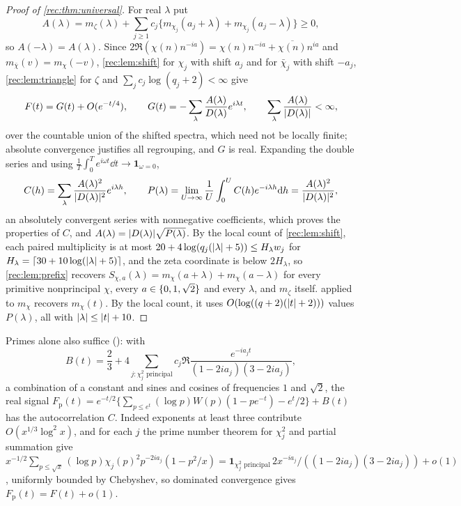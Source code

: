 \begin{proof}[Proof of \cref{rec:thm:universal}]
For real $\lambda$ put
\[
 A(\lambda)=m_\zeta(\lambda)+\sum_{j\ge1}c_j\bigl\{m_{\chi_j}(a_j+\lambda)+m_{\chi_j}(a_j-\lambda)\bigr\}\ge0,
\]
so $A(-\lambda)=A(\lambda)$. Since $2\Re(\chi(n)n^{-ia})=\chi(n)n^{-ia}+\overline{\chi(n)}n^{ia}$ and
$m_{\bar\chi}(v)=m_\chi(-v)$, \cref{rec:lem:shift} for $\chi_j$ with shift $a_j$ and for $\bar\chi_j$ with shift $-a_j$,
\cref{rec:lem:triangle} for $\zeta$ and $\sum_jc_j\log(q_j+2)<\infty$ give
\[
 F(t)=G(t)+O(e^{-t/4}),\qquad G(t)=-\sum_\lambda\frac{A(\lambda)}{D(\lambda)}e^{i\lambda t},\qquad\sum_\lambda\frac{A(\lambda)}{\lvert D(\lambda)\rvert}<\infty,
\]
over the countable union of the shifted spectra, which need not be locally finite; absolute convergence
justifies all regrouping, and $G$ is real. Expanding the double series and using
$\frac1T\int_0^Te^{i\omega t}\dd t\to\mathbf 1_{\omega=0}$,
\[
 C(h)=\sum_\lambda\frac{A(\lambda)^2}{\lvert D(\lambda)\rvert^2}e^{i\lambda h},\qquad
 P(\lambda)=\lim_{U\to\infty}\frac1U\int_0^UC(h)e^{-i\lambda h}\mathrm{d} h=\frac{A(\lambda)^2}{\lvert D(\lambda)\rvert^2},
\]
an absolutely convergent series with nonnegative coefficients, which proves the properties of $C$, and
$A(\lambda)=\lvert D(\lambda)\rvert\sqrt{P(\lambda)}$. By the local count of \cref{rec:lem:shift}, each paired multiplicity is at most
$20+4\log(q_j(\lvert\lambda\rvert+5))\le H_\lambda w_j$ for $H_\lambda=\lceil30+10\log(\lvert\lambda\rvert+5)\rceil$, and the zeta coordinate is
below $2H_\lambda$, so \cref{rec:lem:prefix} recovers $S_{\chi,a}(\lambda)=m_\chi(a+\lambda)+m_\chi(a-\lambda)$ for every primitive
nonprincipal $\chi$, every $a\in\{0,1,\sqrt2\}$ and every $\lambda$, and $m_\zeta$ itself.  applied to
$m_\chi$ recovers $m_\chi(t)$. By the local count, it uses $O(\log((q+2)(\lvert t\rvert+2)))$ values $P(\lambda)$, all with
$\lvert\lambda\rvert\le\lvert t\rvert+10$.
\end{proof}

Primes alone also suffice (\stG): with
\[
 B(t)=\frac23+4\sum_{j:\chi_j^2\text{ principal}}c_j\Re\frac{e^{-ia_jt}}{(1-2ia_j)(3-2ia_j)},
\]
a combination of a constant and sines and cosines of frequencies $1$ and $\sqrt2$, the real signal
$F_{\mathrm p}(t)=e^{-t/2}\{\sum_{p\le e^t}(\log p)W(p)(1-pe^{-t})-e^t/2\}+B(t)$ has the autocorrelation $C$. Indeed
exponents at least three contribute $O(x^{1/3}\log^2x)$, and for each $j$ the prime number theorem for $\chi_j^2$
and partial summation give
$x^{-1/2}\sum_{p\le\sqrt x}(\log p)\chi_j(p)^2p^{-2ia_j}(1-p^2/x)=\mathbf 1_{\chi_j^2\text{ principal}}\,2x^{-ia_j}/((1-2ia_j)(3-2ia_j))+o(1)$,
uniformly bounded by Chebyshev, so dominated convergence gives $F_{\mathrm p}(t)=F(t)+o(1)$.

